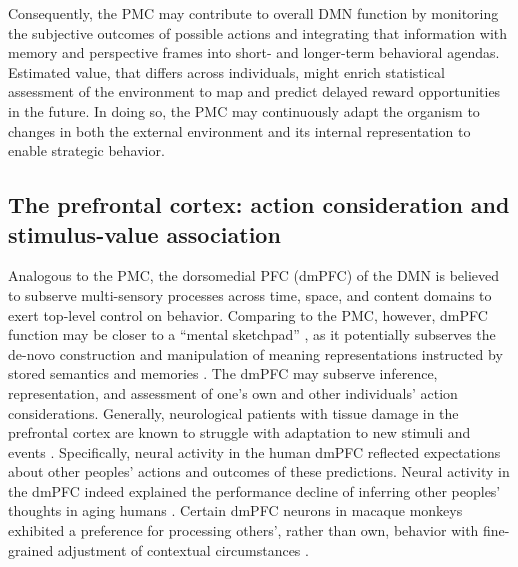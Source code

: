 \documentclass[10pt,letterpaper]{article}
\begin{document}
Consequently, the PMC may contribute to overall DMN function
by monitoring the subjective outcomes
of possible actions and integrating that information
with memory and perspective frames
into short- and longer-term behavioral agendas.
Estimated value, that differs across individuals, might enrich
statistical assessment of the environment
to map and predict delayed reward opportunities in the future.
In doing so, the PMC may continuously adapt the organism to changes
in both the external environment and its internal representation
to enable strategic behavior.


\subsection{The prefrontal cortex: action consideration and stimulus-value association}
Analogous to the PMC,
the dorsomedial PFC (dmPFC) of the DMN is believed to subserve
multi-sensory processes
across time, space, and content domains to
exert top-level control on behavior.
Comparing to the PMC, however,
dmPFC function may be closer to a
``mental sketchpad'' \citep{goldman1996prefrontal}, as it
potentially subserves the de-novo construction and manipulation
of meaning representations instructed by stored semantics and memories
\citep{bzdok2013segregation}.
The dmPFC may subserve inference, representation, and assessment
of one's own and other individuals' action considerations.
Generally,
neurological patients with tissue damage in the prefrontal cortex
are known to struggle with
adaptation to new stimuli and events
\citep{stuss1986frontal}.
Specifically, neural activity in the human dmPFC
reflected expectations about other peoples' actions and
outcomes of these predictions.
Neural activity in the dmPFC indeed explained the performance decline
of inferring other peoples' thoughts in aging humans \citep{moran2012social}.
Certain dmPFC neurons in macaque monkeys exhibited a preference
for processing others', rather than own, behavior
with fine-grained adjustment of contextual circumstances \citep{yoshida2010neural}.
%
\end{document}
